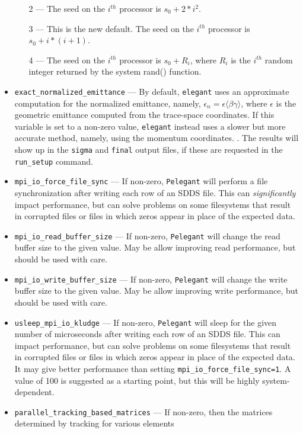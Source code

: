 \documentclass[11pt]{article}
\begin{document}
\begin{itemize}
\begin{itemize}
    \item[2] --- The seed on the $i^{th}$ processor is $s_0+2*i^2$.
    \item[3] --- This is the new default. The seed on the $i^{th}$ processor is $s_0+i*(i+1)$.
    \item[4] --- The seed on the $i^{th}$ processor is $s_0+R_i$, where $R_i$ is the $i^{th}$ random integer returned by
      the system rand() function.
    \end{itemize}
\item \verb|exact_normalized_emittance| --- By default, \verb|elegant| uses an approximate computation for the normalized emittance, namely,
$\epsilon_n = \epsilon\langle\beta\gamma\rangle$, where $\epsilon$ is the geometric emittance computed from the trace-space coordinates.
If this variable is set to a non-zero value, \verb|elegant| instead uses a slower but more accurate method, namely, using the momentum coordinates.
\cite{Floettmann-PRSTAB6-034202}. The results will show up in the \verb|sigma| and \verb|final| output files, if these are requested in the \verb|run_setup| command.
\item \verb|mpi_io_force_file_sync|  --- If non-zero, \verb|Pelegant| will perform a file synchronization after writing each row of
  an SDDS file. This can {\em significantly} impact performance, but can solve problems on some filesystems that result in corrupted files
  or files in which zeros appear in place of the expected data.
\item \verb|mpi_io_read_buffer_size|  --- If non-zero, \verb|Pelegant| will change the read buffer size to the given value. 
  May be allow improving read performance, but should be used with care.
\item \verb|mpi_io_write_buffer_size|  --- If non-zero, \verb|Pelegant| will change the write buffer size to the given value. 
  May be allow improving write performance, but should be used with care.
\item \verb|usleep_mpi_io_kludge|  --- If non-zero, \verb|Pelegant| will sleep for the given number of microseconds after
  writing each row of an SDDS file. This can impact performance, but can solve problems on some filesystems that result in corrupted files
  or files in which zeros appear in place of the expected data.
  It may give better performance than setting \verb|mpi_io_force_file_sync=1|.
  A value of 100 is suggested as a starting point, but this will be highly system-dependent.
\item \verb|parallel_tracking_based_matrices| --- If non-zero, then the matrices determined by tracking for various elements

\end{itemize}
\end{document}
